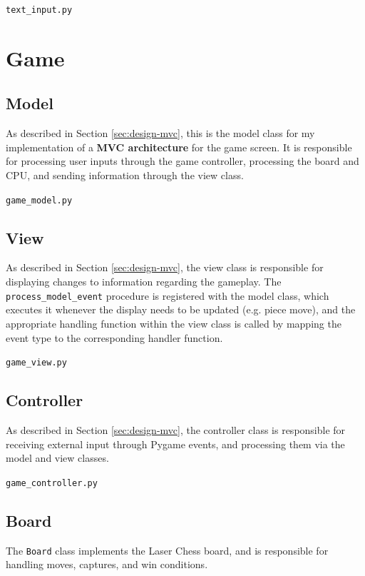 \documentclass[../main/main.tex]{subfiles}
\begin{document}
\noindent\verb|text_input.py|


\section{Game}
\subsection{Model}
As described in Section \ref{sec:design-mvc}, this is the model class for my implementation of a \textbf{MVC architecture} for the game screen. It is responsible for processing user inputs through the game controller, processing the board and CPU, and sending information through the view class.

\noindent\verb|game_model.py|


\subsection{View}
As described in Section \ref{sec:design-mvc}, the view class is responsible for displaying changes to information regarding the gameplay. The \lstinline{process_model_event} procedure is registered with the model class, which executes it whenever the display needs to be updated (e.g. piece move), and the appropriate handling function within the view class is called by mapping the event type to the corresponding handler function.

\noindent\verb|game_view.py|


\subsection{Controller}
As described in Section \ref{sec:design-mvc}, the controller class is responsible for receiving external input through Pygame events, and processing them via the model and view classes.

\noindent\verb|game_controller.py|


\subsection{Board}
The \lstinline{Board} class implements the Laser Chess board, and is responsible for handling moves, captures, and win conditions.
\end{document}

